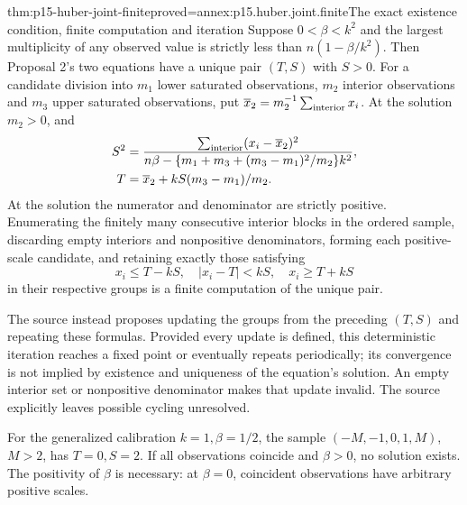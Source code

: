 \begin{hbtheorem}{thm:p15-huber-joint-finite}{proved=annex:p15.huber.joint.finite}{The exact existence condition, finite computation and iteration}
Suppose \(0<\beta<k^2\) and the largest multiplicity of any observed
value is strictly less than \(n(1-\beta/k^2)\).
Then Proposal 2's two equations have a unique pair \((T,S)\)
with \(S>0\).
For a candidate division into \(m_1\) lower saturated observations,
\(m_2\) interior observations and \(m_3\) upper saturated observations,
put \(\overline x_2=m_2^{-1}\sum_{\rm interior}x_i\).
At the solution \(m_2>0\), and
\[
 \begin{split}
 S^2&=\frac{\sum_{\rm interior}(x_i-\overline x_2)^2}
 {n\beta-\{m_1+m_3+(m_3-m_1)^2/m_2\}k^2},\\
 T&=\overline x_2+kS(m_3-m_1)/m_2.
 \end{split}
\]
At the solution the numerator and denominator are strictly positive.
Enumerating the finitely many consecutive interior blocks in the
ordered sample, discarding empty interiors and nonpositive
denominators, forming each positive-scale candidate, and
retaining exactly those satisfying
\[
 x_i\leq T-kS,\quad |x_i-T|<kS,\quad x_i\geq T+kS
\]
in their respective groups is a finite computation of the unique pair.

The source instead proposes updating the groups from the preceding
\((T,S)\) and repeating these formulas. Provided every update is
defined, this deterministic iteration reaches a fixed point or
eventually repeats periodically; its convergence is not implied
by existence and uniqueness of the equation's solution.
An empty interior set or nonpositive denominator makes that
update invalid. The source explicitly leaves possible cycling
unresolved.

For the generalized calibration \(k=1,\beta=1/2\), the sample
\((-M,-1,0,1,M)\), \(M>2\), has \(T=0,S=2\).
If all observations coincide and \(\beta>0\), no solution exists.
The positivity of \(\beta\) is necessary: at \(\beta=0\), coincident
observations have arbitrary positive scales.
\end{hbtheorem}

